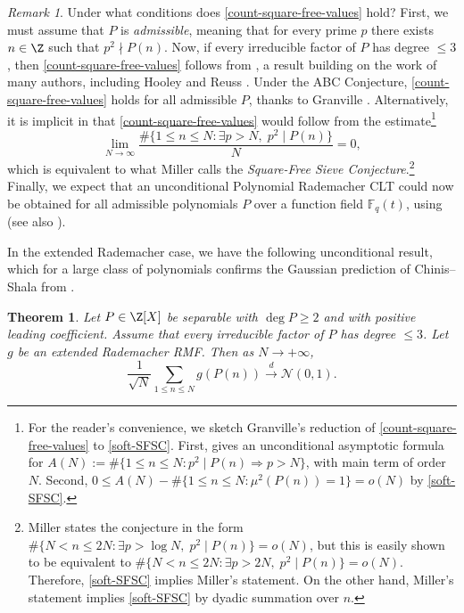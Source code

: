 \documentclass[reqno, 12pt]{amsart}
\theoremstyle{plain}
\newtheorem{theorem}{Theorem}[section]
\theoremstyle{definition}
\theoremstyle{remark}
\newtheorem*{remark}{Remark}
\renewcommand{\le}{\leqslant}
\renewcommand{\ge}{\geqslant}
\begin{document}
\begin{remark}
Under what conditions does \eqref{count-square-free-values} hold?
First, we must assume that $P$ is \emph{admissible},
meaning that for every prime $p$ there exists $n\in \Z$ such that $p^2\nmid P(n)$.
Now, if every irreducible factor of $P$ has degree $\le 3$,
then \eqref{count-square-free-values} follows from
\cite[Theorem~1.2]{BookerBrowning},
a result building on the work of many authors,
including Hooley \cite{H67} and Reuss \cite{Reuss}.
Under the ABC Conjecture, \eqref{count-square-free-values} holds for all admissible $P$,
thanks to Granville \cite{GranvilleABC}.
Alternatively, it is implicit in \cite[\S4, proof of Theorem~1]{GranvilleABC}
that \eqref{count-square-free-values} would follow from the estimate\footnote{For the reader's convenience, we sketch Granville's reduction of \eqref{count-square-free-values} to \eqref{soft-SFSC}.
First, \cite[\S4, Proposition~1]{GranvilleABC}
gives an unconditional asymptotic formula for
$A(N) := \#\{1\le n\le N: p^2\mid P(n) \Rightarrow p>N\}$,
with main term of order $N$.
Second, $0\le A(N) - \#\{1\le n\le N: \mu^2(P(n))=1\} = o(N)$
by \eqref{soft-SFSC}.}
\begin{equation}
\label{soft-SFSC}
\lim_{N\to \infty} \frac{\#\{1\le n\le N: \exists p>N,\; p^2\mid P(n)\}}{N}
= 0,
\end{equation}
which is equivalent to
what Miller \cite[\S2.2]{Miller} calls the \emph{Square-Free Sieve Conjecture}.\footnote{Miller states the conjecture
in the form $\#\{N< n\le 2N: \exists p>\log{N},\; p^2\mid P(n)\} = o(N)$,
but this is easily shown to be equivalent to
$\#\{N<n\le 2N: \exists p>2N,\; p^2\mid P(n)\} = o(N)$.
Therefore, \eqref{soft-SFSC}
implies Miller's statement.
On the other hand, Miller's statement implies \eqref{soft-SFSC}
by dyadic summation over $n$.}
Finally, we expect that an unconditional Polynomial Rademacher CLT
could now be obtained for all admissible polynomials $P$
over a function field $\mathbb{F}_q(t)$,
using \cite{Ramsay} (see also \cite{Poonen}).
\end{remark}

In the extended Rademacher case, we have the following unconditional result,
which
for a large class of polynomials
confirms the Gaussian prediction of Chinis--Shala from \cite[\S1.4]{CS25}.

\begin{theorem}
\label{extended-rademacher-P}
Let $P\in \Z[X] $ be separable with $\deg{P}\ge 2$
and with positive leading coefficient.
Assume that every irreducible factor of $P$ has degree $\le 3$.
Let $g$ be an extended Rademacher RMF.
Then as $N\to +\infty$,
\[\frac{1}{\sqrt{N}} \sum_{1\le n \le N} g(P(n)) \xrightarrow[]{d} \mathcal{N}(0,1). \]
\end{theorem}
\end{document}

